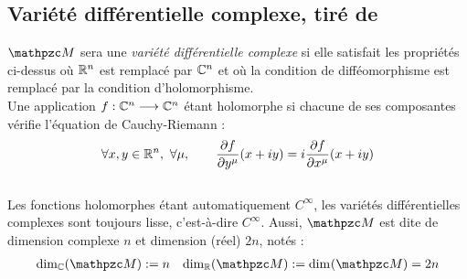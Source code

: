 \begin{annexe}
\subsection{Variété différentielle complexe, tiré de \cite{nakahara_geometry_2003}}\label{ann:VDC}


$\manu$ sera une \emph{variété différentielle complexe} si elle satisfait les propriétés ci-dessus où $\mathbb{R}^n$ est remplacé par $\mathbb{C}^n$ et où la condition de difféomorphisme est remplacé par la condition d'holomorphisme. 
\\
Une application $f : \mathbb{C}^n\longrightarrow \mathbb{C}^n$ étant holomorphe si chacune de ses composantes vérifie l'équation de Cauchy-Riemann :
\[\forall x,y\in\R^n,\ \forall \mu,\qquad \frac{\partial f }{\partial y^\mu}(x+iy) = i \frac{\partial f }{\partial x^\mu}(x+iy)\]
\\
Les fonctions holomorphes étant automatiquement $C^\infty$, les variétés différentielles complexes sont toujours lisse, c'est-à-dire $C^\infty$. Aussi, $\manu$ est dite de dimension complexe $n$ et dimension (réel) $2n$, notés :
\begin{align}\label{eq:manuC-base_cano}
	\dim[\C](\manu) &\defeq n  &  \dim[\R] (\manu) \defeq \dim (\manu) = 2n
\end{align}
\\


\end{annexe}
